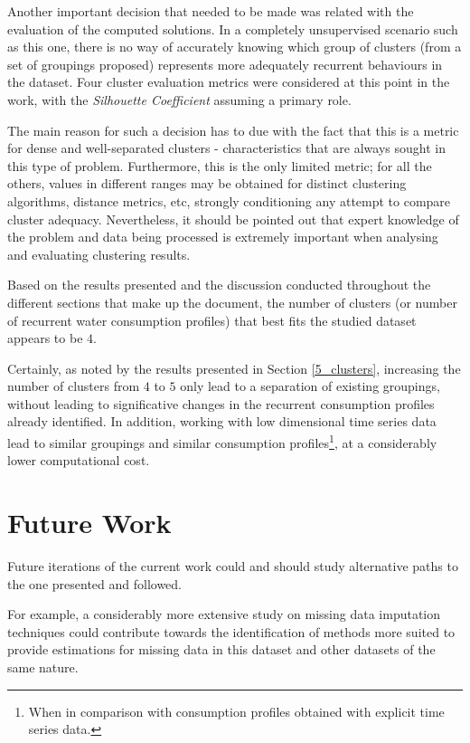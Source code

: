 \documentclass[9pt,journal,compsoc]{IEEEtran}
\begin{document}
Another important decision that needed to be made was related with the evaluation of the computed solutions. In a completely unsupervised scenario such as this one, there is no way of accurately knowing which group of clusters (from a set of groupings proposed) represents more adequately recurrent behaviours in the dataset. Four cluster evaluation metrics were considered at this point in the work, with the \emph{Silhouette Coefficient} assuming a primary role.

The main reason for such a decision has to due with the fact that this is a metric for dense and well-separated clusters - characteristics that are always sought in this type of problem. Furthermore, this is the only limited metric; for all the others, values in different ranges may be obtained for distinct clustering algorithms, distance metrics, etc, strongly conditioning any attempt to compare cluster adequacy. Nevertheless, it should be pointed out that expert knowledge of the problem and data being processed is extremely important when analysing and evaluating clustering results.

Based on the results presented and the discussion conducted throughout the different sections that make up the document, the number of clusters (or number of recurrent water consumption profiles) that best fits the studied dataset appears to be $4$.

Certainly, as noted by the results presented in Section \ref{5_clusters}, increasing the number of clusters from $4$ to $5$ only lead to a separation of existing groupings, without leading to significative changes in the recurrent consumption profiles already identified. In addition, working with low dimensional time series data lead to similar groupings and similar consumption profiles\footnote{When in comparison with consumption profiles obtained with explicit time series data.}, at a considerably lower computational cost.

\section{Future Work}
\label{future_work}

Future iterations of the current work could and should study alternative paths to the one presented and followed.

For example, a considerably more extensive study on missing data imputation techniques could contribute towards the identification of methods more suited to provide estimations for missing data in this dataset and other datasets of the same nature.
\end{document}
